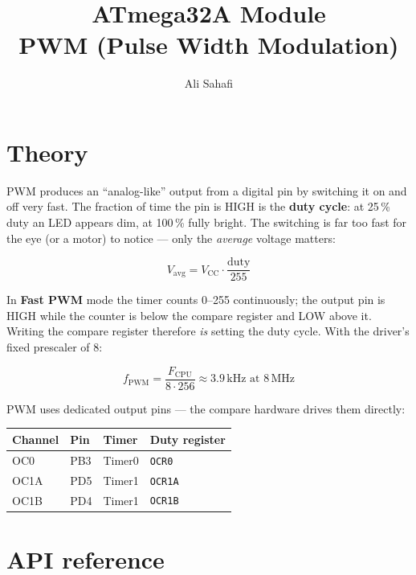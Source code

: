 \documentclass[11pt,a4paper]{article}
\title{ATmega32A Module \\ \Large PWM (Pulse Width Modulation)}
\author{Ali Sahafi}
\date{}
\begin{document}
\maketitle

\section{Theory}

PWM produces an ``analog-like'' output from a digital pin by switching it on
and off very fast. The fraction of time the pin is HIGH is the \textbf{duty
cycle}: at 25\,\% duty an LED appears dim, at 100\,\% fully bright. The
switching is far too fast for the eye (or a motor) to notice --- only the
\emph{average} voltage matters:

\begin{equation*}
V_{\text{avg}} = V_{\text{CC}} \cdot \frac{\text{duty}}{255}
\end{equation*}

In \textbf{Fast PWM} mode the timer counts 0--255 continuously; the output
pin is HIGH while the counter is below the compare register and LOW above
it. Writing the compare register therefore \emph{is} setting the duty cycle.
With the driver's fixed prescaler of 8:

\begin{equation*}
f_{\text{PWM}} = \frac{F_{\text{CPU}}}{8 \cdot 256} \approx 3.9\,\text{kHz at } 8\,\text{MHz}
\end{equation*}

PWM uses dedicated output pins --- the compare hardware drives them directly:

\begin{center}
\begin{tabular}{llll}
\toprule
\textbf{Channel} & \textbf{Pin} & \textbf{Timer} & \textbf{Duty register} \\
\midrule
OC0  & PB3 & Timer0 & \texttt{OCR0}  \\
OC1A & PD5 & Timer1 & \texttt{OCR1A} \\
OC1B & PD4 & Timer1 & \texttt{OCR1B} \\
\bottomrule
\end{tabular}
\end{center}

\section{API reference}
\end{document}
